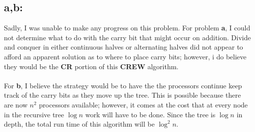 \documentclass[12pt]{article}
\begin{document}
\subsection*{a,b:}
Sadly, I was unable to make any progress on this problem.  For problem 
\textbf{a}, I could not determine what to do with the carry bit that
might occur on addition.  Divide and conquer in either continuous halves
or alternating halves did not appear to afford an apparent solution as
to where to place carry bits; however, i do believe they would be the 
\textbf{CR} portion of this \textbf{CREW} algorithm.\\\\
For \textbf{b}, I believe the strategy would be to have the the processors
continue keep track of the carry bits as they move up the tree.  This is 
possible because there are now $n^2$ processors available; however, it 
comes at the cost that at every node in the recursive tree $\log n$ work
will have to be done.  Since the tree is $\log n$ in depth, the total run
time of this algorithm will be $\log^2 n$.
\end{document}
